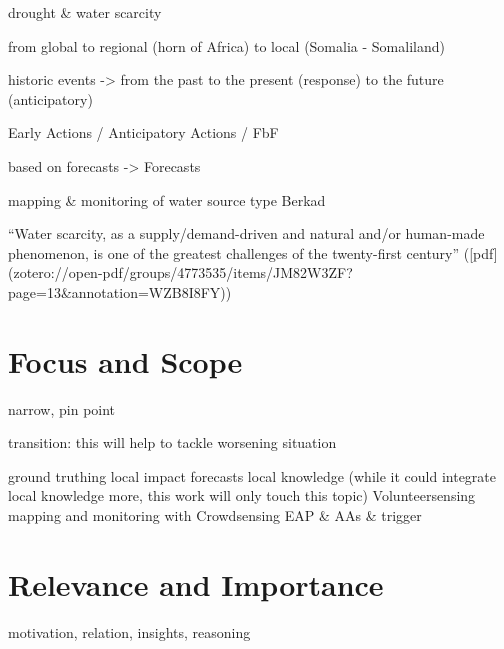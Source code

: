 drought & water scarcity


from global to regional (horn of Africa) to local (Somalia - Somaliland)


historic events -> from the past to the present (response) to the future (anticipatory)



Early Actions / Anticipatory Actions / FbF



based on forecasts -> Forecasts



mapping & monitoring of water source type Berkad


“Water scarcity, as a supply/demand-driven and natural and/or human-made phenomenon, is one of the greatest challenges of the twenty-first century” ([pdf](zotero://open-pdf/groups/4773535/items/JM82W3ZF?page=13&annotation=WZB8I8FY))

\section{Focus and Scope}
narrow, pin point


transition: this will help to tackle worsening situation


ground truthing
local impact forecasts
local knowledge (while it could integrate local knowledge more, this work will only touch this topic)
Volunteersensing
mapping and monitoring with Crowdsensing
EAP & AAs & trigger







\section{Relevance and Importance}
motivation, relation, insights, reasoning


